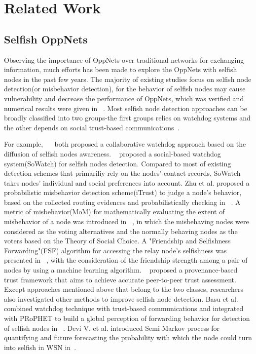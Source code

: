 \section{Related Work}
\label{sec:related}
\subsection{Selfish OppNets}
Observing the importance of OppNets over traditional networks for exchanging information, much efforts has been made to explore the OppNets with selfish nodes in the past few years. 
The majority of existing studies focus on selfish node detection(or misbehavior detection), for the behavior of selfish nodes may cause vulnerability and decrease the performance of OppNets, which was verified and numerical results were given in ~\cite{DBLP:journals/icl/Karaliopoulos09}.
Most selfish node detection approaches can be broadly classified into two groups-the first groups relies on watchdog systems and the other depends on social trust-based communications~\cite{DBLP:journals/comsur/JedariXN18}. 

For example, ~\cite{DBLP:conf/mswim/Hernandez-OralloOCCM12}~\cite{DBLP:journals/tmc/Hernandez-Orallo15} both proposed a collaborative watchdog approach based on the diffusion of selfish nodes awareness.
~\cite{DBLP:journals/fgcs/JedariXCDTA19} proposed a social-based watchdog system(SoWatch) for selfish nodes detection. Compared to most of existing detection schemes that primariliy rely on the nodes' contact records, SoWatch takes nodes' individual and social preferences into account.
Zhu et al. proposed a probabilistic misbehavior detection scheme(iTrust) to judge a node's behavior, based on the collected routing evidences and probabilistically checking in ~\cite{DBLP:journals/tpds/ZhuDGDC14}. 
A metric of misbehavior(MoM) for mathematically evaluating the extent of misbehavior of a node was introduced in ~\cite{DBLP:conf/icc/ChatterjeeSM15}, in which the misbehaving nodes were considered as the voting alternatives and the normally behaving nodes as the voters based on the Theory of Social Choice.
A "Friendship and Selfishness Forwarding"(FSF) algorithm for accessing the relay node's selfishness was presented in ~\cite{DBLP:journals/corr/SouzaMGSMCC17}, with the consideration of the friendship strength among a pair of nodes by using a machine learning algorithm.
~\cite{DBLP:journals/tdsc/ChoC18} proposed a provenance-based trust framework that aims to achieve accurate peer-to-peer trust assessment.
Except approaches mentioned above that belong to the two classes, researchers also investigated other methods to improve selfish node detection.
Basu et al. combined watchdog technique with trust-based communications and integrated with PRoPHET to build a global perception of forwarding behavior for detection of selfish nodes in ~\cite{DBLP:journals/jnca/BasuBRB18}.
Devi V. et al. introduced Semi Markov process for quantifying and future forecasting the probability with which the node could turn into selfish in WSN in~\cite{DBLP:journals/cybersec/VR19}.

